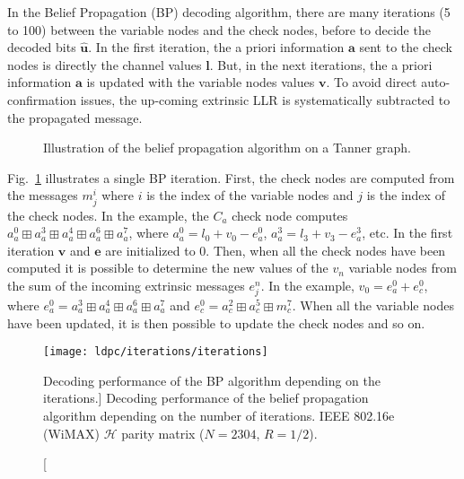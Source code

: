 In the Belief Propagation (BP) decoding algorithm, there are many iterations (5
to 100) between the variable nodes and the check nodes, before to decide the
decoded bits $\bm{\hat{u}}$. In the first iteration, the a priori information
$\bm{a}$ sent to the check nodes is directly the channel values $\bm{l}$. But,
in the next iterations, the a priori information $\bm{a}$ is updated with the
variable nodes values $\bm{v}$. To avoid direct auto-confirmation issues, the
up-coming extrinsic LLR is systematically subtracted to the propagated message.

\begin{figure}[htp]
  \centering
  \quad
  \caption{Illustration of the belief propagation algorithm on a Tanner graph.}
  \label{fig:alg_ldpc_bp}
\end{figure}

Fig.~\ref{fig:alg_ldpc_bp} illustrates a single BP iteration. First, the check
nodes are computed from the messages $m_j^i$ where $i$ is the index of the
variable nodes and $j$ is the index of the check nodes. In the example, the
$C_a$ check node computes $a^0_a \boxplus a^3_a \boxplus a^4_a \boxplus a^6_a
\boxplus a^7_a$, where $a^0_a = l_0 + v_0 - e^{0}_a$, $a^3_a = l_3 + v_3 -
e^{3}_a$, etc. In the first iteration $\bm{v}$ and $\bm{e}$ are initialized to
0. Then, when all the check nodes have been computed it is possible to
determine the new values of the $v_n$ variable nodes from the sum of the
incoming extrinsic messages $e_j^n$. In the example, $v_0 = e^0_a + e^0_c$,
where $e^0_a = a^3_a \boxplus a^4_a \boxplus a^6_a \boxplus a^7_a$ and $e^0_c =
a^2_c \boxplus a^5_c \boxplus m^7_c$. When all the variable nodes have been
updated, it is then possible to update the check nodes and so on.

\begin{figure}[htp]
  \centering
  \texttt{[image: ldpc/iterations/iterations]}
  \caption
    [Decoding performance of the BP algorithm depending on the iterations.]
    {Decoding performance of the belief propagation algorithm depending on the
     number of iterations. IEEE 802.16e (WiMAX) $\mathcal{H}$ parity matrix
     ($N=2304$, $R=1/2$).}
  \label{plot:alg_ldpc_iterations}
\end{figure}

